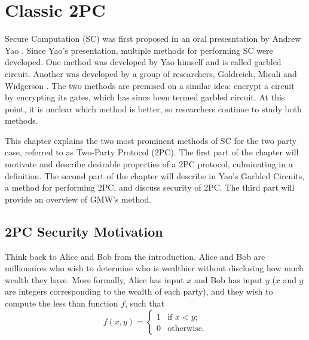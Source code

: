 \chapter{Classic 2PC}
Secure Computation (SC) was first proposed in an oral presesntation by Andrew Yao \cite{yao-original}.
Since Yao's presentation, multiple methods for performing SC were developed.
One method was developed by Yao himself and is called garbled circuit.
Another was developed by a group of researchers, Goldreich, Micali and Widgerson .
The two methods are premised on a similar idea: encrypt a circuit by encrypting its gates, which has since been termed garbled circuit.
At this point, it is unclear which method is better, so researchers continue to study both methods.

This chapter explains the two most prominent methods of SC for the two party case, referred to as Two-Party Protocol (2PC).
The first part of the chapter will motivate and describe desirable properties of a 2PC protocol, culminating in a definition. 
The second part of the chapter will describe in Yao's Garbled Circuits, a method for performing 2PC, and discuss security of 2PC.
The third part will provide an overview of GMW's method.

\section{2PC Security Motivation}
Think back to Alice and Bob from the introduction. 
Alice and Bob are millionaires who wish to determine who is wealthier without disclosing how much wealth they have.
More formally, Alice has input $x$ and Bob has input $y$ ($x$ and $y$ are integers corresponding to the wealth of each party), and they wish to compute the less than function $f$, such that 
\begin{equation}
f(x,y) = \left\{
\begin{array}{lr}
    1 & \text{if } x < y \text{;} \\
    0 & \text{otherwise.}
\end{array}
\right.
\end{equation} 

